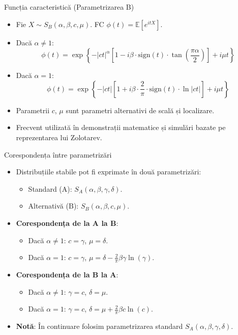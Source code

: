 \documentclass[9pt, aspectratio=169, t]{beamer}
\theoremstyle{definition}
\newcommand{\E}{\mathbb{E}}
\begin{document}
\begin{frame}{Funcția caracteristică (Parametrizarea B)}
\begin{itemize}
    \item Fie $X \sim S_B(\alpha, \beta, c, \mu)$. FC $\phi(t) = \E[e^{itX}]$.
    \item Dacă $\alpha \neq 1$:
    \[
        \phi(t) = \exp\left\{-|ct|^\alpha\left[1 - i\beta \cdot \text{sign}(t) \cdot \tan\left(\frac{\pi\alpha}{2}\right)\right] + i\mu t\right\}
    \]
    \item Dacă $\alpha = 1$:
    \[
        \phi(t) = \exp\left\{-|ct|\left[1 + i\beta \cdot \frac{2}{\pi} \cdot \text{sign}(t) \cdot \ln|ct|\right] + i\mu t\right\}
    \]
    \item Parametrii $c$, $\mu$ sunt parametri alternativi de scală și localizare.
    \item Frecvent utilizată în demonstrații matematice și simulări bazate pe reprezentarea lui Zolotarev.
\end{itemize}
\end{frame}

\begin{frame}{Corespondența între parametrizări}
\begin{itemize}
    \item Distribuțiile stabile pot fi exprimate în două parametrizări:
    \begin{itemize}
        \item Standard (A): $S_A(\alpha, \beta, \gamma, \delta)$.
        \item Alternativă (B): $S_B(\alpha, \beta, c, \mu)$.
    \end{itemize}
    \item \textbf{Corespondența de la A la B}:
    \begin{itemize}
        \item Dacă $\alpha \neq 1$: $c = \gamma$, \quad $\mu = \delta$.
        \item Dacă $\alpha = 1$: $c = \gamma$, \quad $\mu = \delta - \frac{2}{\pi}\beta\gamma\ln(\gamma)$.
    \end{itemize}
    \item \textbf{Corespondența de la B la A}:
    \begin{itemize}
        \item Dacă $\alpha \neq 1$: $\gamma = c$, \quad $\delta = \mu$.
        \item Dacă $\alpha = 1$: $\gamma = c$, \quad $\delta = \mu + \frac{2}{\pi}\beta c\ln(c)$.
    \end{itemize}
    \item \textbf{Notă}: În continuare folosim parametrizarea standard $S_A(\alpha, \beta, \gamma, \delta)$.
\end{itemize}
\end{frame}
\end{document}
